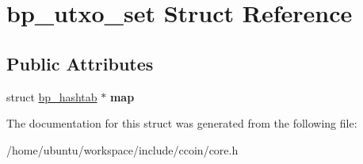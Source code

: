 \hypertarget{structbp__utxo__set}{\section{bp\-\_\-utxo\-\_\-set Struct Reference}
\label{structbp__utxo__set}
}
\subsection*{Public Attributes}
\begin{DoxyCompactItemize}
\item 
\hypertarget{structbp__utxo__set_a6b076f424e7e683a056e8a07aea36e63}{struct \hyperlink{structbp__hashtab}{bp\-\_\-hashtab} $\ast$ {\bfseries map}}\label{structbp__utxo__set_a6b076f424e7e683a056e8a07aea36e63}

\end{DoxyCompactItemize}


The documentation for this struct was generated from the following file\-:\begin{DoxyCompactItemize}
\item 
/home/ubuntu/workspace/include/ccoin/core.\-h\end{DoxyCompactItemize}

